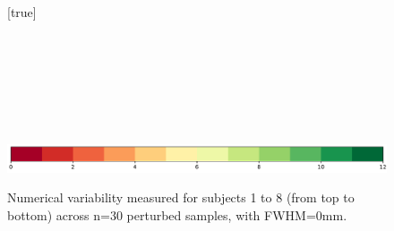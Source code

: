 \documentclass[lettersize,journal]{IEEEtran}
\begin{document}


\begin{landscape}
  \begin{figure}
    \vspace*{-2cm}
    \centering
    [true] \\
     \\
     \\
     \\
     \\
     \\
     \\
     \\
    \includegraphics*[width=.7\linewidth]{figures/colorbar_sigbit_discrete.pdf}
    \caption{Numerical variability measured for subjects 1 to 8 (from top to bottom) across n=30 perturbed samples, with FWHM=0mm. }
    \label{fig:uncertainty-maps-0mm-disc}
  \end{figure}
\end{landscape}
\end{document}
